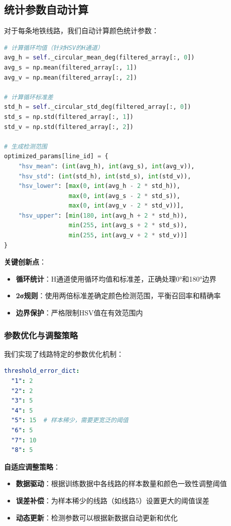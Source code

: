 \documentclass[12pt,a4paper]{article}
\begin{document}
\subsection{统计参数自动计算}

对于每条地铁线路，我们自动计算颜色统计参数：

\begin{lstlisting}[language=Python]
# 计算循环均值（针对HSV的H通道）
avg_h = self._circular_mean_deg(filtered_array[:, 0])
avg_s = np.mean(filtered_array[:, 1])
avg_v = np.mean(filtered_array[:, 2])

# 计算循环标准差
std_h = self._circular_std_deg(filtered_array[:, 0])
std_s = np.std(filtered_array[:, 1])
std_v = np.std(filtered_array[:, 2])

# 生成检测范围
optimized_params[line_id] = {
    "hsv_mean": (int(avg_h), int(avg_s), int(avg_v)),
    "hsv_std": (int(std_h), int(std_s), int(std_v)),
    "hsv_lower": [max(0, int(avg_h - 2 * std_h)), 
                  max(0, int(avg_s - 2 * std_s)), 
                  max(0, int(avg_v - 2 * std_v))],
    "hsv_upper": [min(180, int(avg_h + 2 * std_h)), 
                  min(255, int(avg_s + 2 * std_s)), 
                  min(255, int(avg_v + 2 * std_v))]
}
\end{lstlisting}

\textbf{关键创新点}：
\begin{itemize}
    \item \textbf{循环统计}：H通道使用循环均值和标准差，正确处理0°和180°边界
    \item \textbf{2σ规则}：使用两倍标准差确定颜色检测范围，平衡召回率和精确率
    \item \textbf{边界保护}：严格限制HSV值在有效范围内
\end{itemize}

\subsubsection{参数优化与调整策略}

我们实现了线路特定的参数优化机制：

\begin{lstlisting}[language=YAML]
threshold_error_dict:
  "1": 2
  "2": 2  
  "3": 5
  "4": 5
  "5": 15  # 样本稀少，需要更宽泛的阈值
  "6": 5
  "7": 10
  "8": 5
\end{lstlisting}

\textbf{自适应调整策略}：
\begin{itemize}
    \item \textbf{数据驱动}：根据训练数据中各线路的样本数量和颜色一致性调整阈值
    \item \textbf{误差补偿}：为样本稀少的线路（如线路5）设置更大的阈值误差
    \item \textbf{动态更新}：检测参数可以根据新数据自动更新和优化
\end{itemize}
\end{document}
